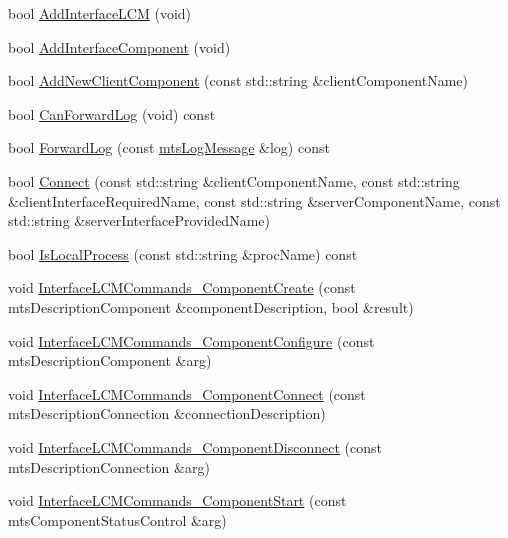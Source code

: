 \begin{DoxyCompactItemize}
\item 
bool \hyperlink{classmts_manager_component_client_a5276a53ae1b4afeec79205cf2e642d5f}{Add\+Interface\+L\+C\+M} (void)
\item 
bool \hyperlink{classmts_manager_component_client_a655496f61e6fe26b83fa6b3aec5cbc29}{Add\+Interface\+Component} (void)
\item 
bool \hyperlink{classmts_manager_component_client_a8145aeb56a32dbfc6b8b0646054c3c82}{Add\+New\+Client\+Component} (const std\+::string \&client\+Component\+Name)
\item 
bool \hyperlink{classmts_manager_component_client_a71e559190d77acb80c5421ff3588a0d7}{Can\+Forward\+Log} (void) const 
\item 
bool \hyperlink{classmts_manager_component_client_af97b807f51afb47dded13b9bfb78163e}{Forward\+Log} (const \hyperlink{classmts_log_message}{mts\+Log\+Message} \&log) const 
\item 
bool \hyperlink{classmts_manager_component_client_a69595c3e1cac7926dc094424faab283e}{Connect} (const std\+::string \&client\+Component\+Name, const std\+::string \&client\+Interface\+Required\+Name, const std\+::string \&server\+Component\+Name, const std\+::string \&server\+Interface\+Provided\+Name)
\item 
bool \hyperlink{classmts_manager_component_client_a7b8ecbd2a06ed59f5381f55977c021da}{Is\+Local\+Process} (const std\+::string \&proc\+Name) const 
\item 
void \hyperlink{classmts_manager_component_client_a6634914815df194f57df1b51c3ecce4a}{Interface\+L\+C\+M\+Commands\+\_\+\+Component\+Create} (const mts\+Description\+Component \&component\+Description, bool \&result)
\item 
void \hyperlink{classmts_manager_component_client_aef47087651c91c346ebedf468874fdc7}{Interface\+L\+C\+M\+Commands\+\_\+\+Component\+Configure} (const mts\+Description\+Component \&arg)
\item 
void \hyperlink{classmts_manager_component_client_a510cba33ccd436b1ac56aeb338718c8c}{Interface\+L\+C\+M\+Commands\+\_\+\+Component\+Connect} (const mts\+Description\+Connection \&connection\+Description)
\item 
void \hyperlink{classmts_manager_component_client_afc1fc4c05f0bc594d9eace2499dbb98b}{Interface\+L\+C\+M\+Commands\+\_\+\+Component\+Disconnect} (const mts\+Description\+Connection \&arg)
\item 
void \hyperlink{classmts_manager_component_client_aa4241a0b7f26c01813bf25f3b720d4c8}{Interface\+L\+C\+M\+Commands\+\_\+\+Component\+Start} (const mts\+Component\+Status\+Control \&arg)

\end{DoxyCompactItemize}
